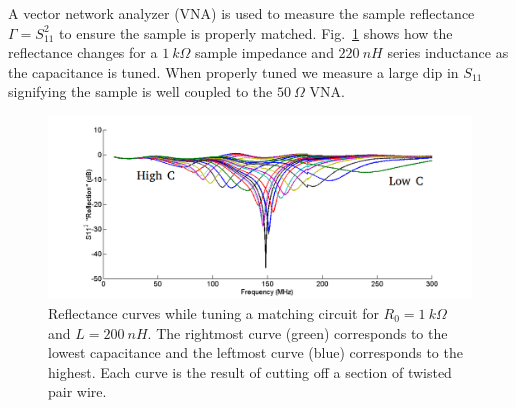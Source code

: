 A vector network analyzer (VNA) is used to measure the sample reflectance $\Gamma = S_{11}^2$ to ensure the sample is properly matched. Fig.~\ref{fig:gimmick_tuning} shows how the reflectance changes for a $1~k\Omega$ sample impedance and $220~nH$ series inductance as the capacitance is tuned. When properly tuned we measure a large dip in $S_{11}$ signifying the sample is well coupled to the $50~\Omega$ VNA.
\begin{figure}
\centering
\includegraphics[width=\textwidth]{figures/Johnson_noise_thermometry/gimmick_tuning.png}
\caption{Reflectance curves while tuning a matching circuit for $R_0 = 1~k\Omega$ and $L = 200~nH$. The rightmost curve (green) corresponds to the lowest capacitance and the leftmost curve (blue) corresponds to the highest. Each curve is the result of cutting off a section of twisted pair wire.}
\label{fig:gimmick_tuning}
\end{figure} 

